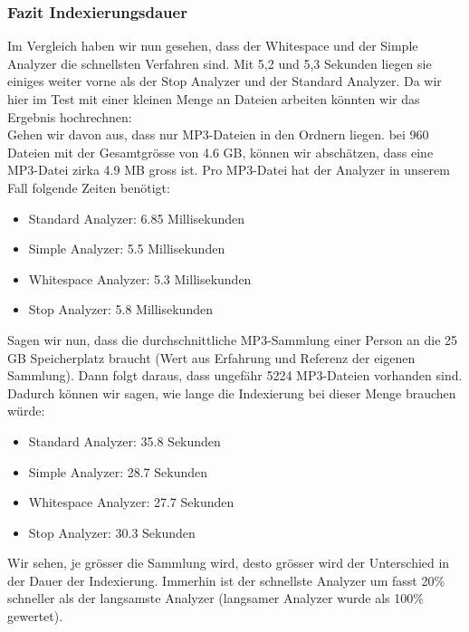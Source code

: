\documentclass[12pt,a4paper,ngerman]{report}
\begin{document}
\subsubsection*{Fazit Indexierungsdauer}
Im Vergleich haben wir nun gesehen, dass der Whitespace und der Simple Analyzer die schnellsten Verfahren sind. Mit 5,2 und 5,3 Sekunden liegen sie einiges weiter vorne als der Stop Analyzer und der Standard Analyzer. Da wir hier im Test mit einer kleinen Menge an Dateien arbeiten könnten wir das Ergebnis hochrechnen:\\
Gehen wir davon aus, dass nur MP3-Dateien in den Ordnern liegen. bei 960 Dateien mit der Gesamtgrösse von 4.6 GB, können wir abschätzen, dass eine MP3-Datei zirka 4.9 MB gross ist. Pro MP3-Datei hat der Analyzer in unserem Fall folgende Zeiten benötigt:
\begin{itemize}
	\item Standard Analyzer: 6.85 Millisekunden
	\item Simple Analyzer: 5.5 Millisekunden
	\item Whitespace Analyzer: 5.3 Millisekunden
	\item Stop Analyzer: 5.8 Millisekunden
\end{itemize}
Sagen wir nun, dass die durchschnittliche MP3-Sammlung einer Person an die 25 GB Speicherplatz braucht (Wert aus Erfahrung und Referenz der eigenen Sammlung). Dann folgt daraus, dass ungefähr 5224 MP3-Dateien vorhanden sind. Dadurch können wir sagen, wie lange die Indexierung bei dieser Menge brauchen würde:
\begin{itemize}
	\item Standard Analyzer: 35.8 Sekunden
	\item Simple Analyzer: 28.7 Sekunden
	\item Whitespace Analyzer: 27.7 Sekunden
	\item Stop Analyzer: 30.3 Sekunden
\end{itemize}
Wir sehen, je grösser die Sammlung wird, desto grösser wird der Unterschied in der Dauer der Indexierung. Immerhin ist der schnellste Analyzer um fasst 20\% schneller als der langsamste Analyzer (langsamer Analyzer wurde als 100\% gewertet).
\end{document}
